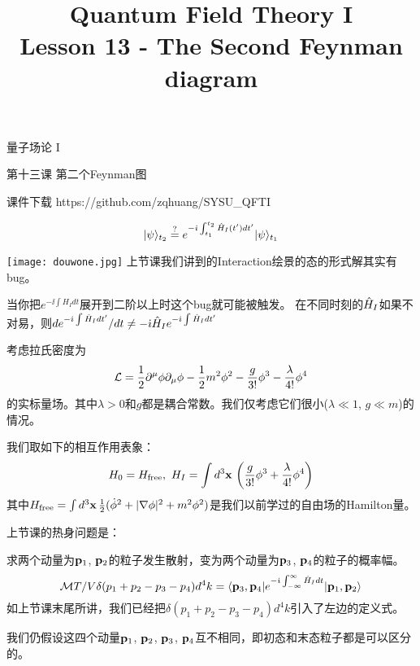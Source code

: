 \documentclass[CJK]{beamer}
\title{Quantum Field Theory I \\ Lesson 13 - The Second Feynman diagram}
\author{}
\date{}
\begin{document}
\begin{frame}
 
\begin{center}
\begin{Large}
\bch
量子场论 I 

{\vskip 0.3in}

第十三课 第二个Feynman图

\ech
\end{Large}
\end{center}

\vskip 0.2in

\bch
课件下载
\ech
https://github.com/zqhuang/SYSU\_QFTI

\end{frame}

\begin{frame}
\bch

$$|\psi\rangle_{t_2} \stackrel{?}{=} e^{-{\dot{\imath}}\int_{t_1}^{t_2} {\hat{H}}_I(t') dt'} |\psi\rangle_{t_1}$$

\texttt{[image: douwone.jpg]}
\emini
{}
上节课我们讲到的Interaction绘景的态的形式解其实有bug。
\emini


当你把$e^{-\ii\int H_Idt}$展开到二阶以上时这个bug就可能被触发。
\skipline
{\small
在不同时刻的${\hat{H}}_I$如果不对易，则$d e^{-{\dot{\imath}}\int {\hat{H}}_I dt'}/dt \ne -{\dot{\imath}} {\hat{H}}_I e^{-{\dot{\imath}}\int {\hat{H}}_I dt'}$
}
\skipline


\ech
\end{frame}

\begin{frame}
\bch

\ech
\end{frame}


\begin{frame} 
\bch
考虑拉氏密度为
$${\mathcal{L}} = \frac{1}{2}\partial^\mu\phi\partial_\mu\phi - \frac{1}{2}m^2\phi^2 - \frac{g}{3!}\phi^3- \frac{\lambda}{4!}\phi^4$$
的实标量场。其中$\lambda>0$和$g$都是耦合常数。我们仅考虑它们很小($\lambda \ll 1$, $g\ll m$)的情况。

我们取如下的相互作用表象：
$$ H_0 = H_{\rm free},\ H_I = \int d^3{\mathbf{x}}\, \left(\frac{g}{3!}\phi^3 + \frac{\lambda}{4!} \phi^4\right)$$
其中$H_{\rm free} = \int d^3{\mathbf{x}}\, \frac{1}{2}(\dot\phi^2 + |\nabla \phi|^2 + m^2\phi^2)$是我们以前学过的自由场的Hamilton量。

\ech
\end{frame}




\begin{frame} 
\bch
上节课的热身问题是：
\skipline

求两个动量为${\mathbf{p}}_1$, ${\mathbf{p}}_2$的粒子发生散射，变为两个动量为${\mathbf{p}}_3$, ${\mathbf{p}}_4$的粒子的概率幅。
$${\mathcal{M}} T/V \delta(p_1+p_2-p_3-p_4)d^4k= \langle {\mathbf{p}}_3, {\mathbf{p}}_4|  e^{-{\dot{\imath}}\int_{-\infty}^\infty \hat{H}_I dt}|{\mathbf{p}}_1,{\mathbf{p}}_2\rangle$$
如上节课末尾所讲，我们已经把$\delta(p_1+p_2-p_3-p_4)d^4k$引入了左边的定义式。
\skipline

我们仍假设这四个动量${\mathbf{p}}_1$, ${\mathbf{p}}_2$, ${\mathbf{p}}_3$, ${\mathbf{p}}_4$互不相同，即初态和末态粒子都是可以区分的。
\ech
\end{frame}
\end{document}
